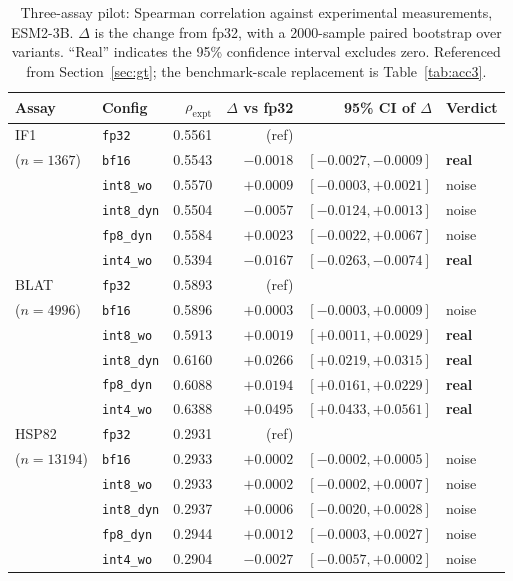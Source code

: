 \documentclass[11pt]{article}
\newcommand{\cfg}[1]{\texttt{#1}}
\begin{document}
\begin{table}[htb]
\centering
\caption{Three-assay pilot: Spearman correlation against experimental
measurements, ESM2-3B. $\Delta$ is the change from fp32, with a 2000-sample
paired bootstrap over variants. ``Real'' indicates the 95\% confidence interval
excludes zero. Referenced from Section~\ref{sec:gt}; the benchmark-scale
replacement is Table~\ref{tab:acc3}.}
\label{tab:pilotacc}
\small
\begin{tabular}{llrrrl}
\toprule
Assay & Config & $\rho_{\text{expt}}$ & $\Delta$ vs fp32 & 95\% CI of $\Delta$ & Verdict \\
\midrule
IF1        & \cfg{fp32}      & 0.5561 & (ref)    &                      &  \\
($n{=}1367$)& \cfg{bf16}      & 0.5543 & $-0.0018$ & $[-0.0027, -0.0009]$ & \textbf{real} \\
           & \cfg{int8\_wo}  & 0.5570 & $+0.0009$ & $[-0.0003, +0.0021]$ & noise \\
           & \cfg{int8\_dyn} & 0.5504 & $-0.0057$ & $[-0.0124, +0.0013]$ & noise \\
           & \cfg{fp8\_dyn}  & 0.5584 & $+0.0023$ & $[-0.0022, +0.0067]$ & noise \\
           & \cfg{int4\_wo}  & 0.5394 & $\mathbf{-0.0167}$ & $[-0.0263, -0.0074]$ & \textbf{real} \\
\midrule
BLAT       & \cfg{fp32}      & 0.5893 & (ref)    &                      &  \\
($n{=}4996$)& \cfg{bf16}      & 0.5896 & $+0.0003$ & $[-0.0003, +0.0009]$ & noise \\
           & \cfg{int8\_wo}  & 0.5913 & $+0.0019$ & $[+0.0011, +0.0029]$ & \textbf{real} \\
           & \cfg{int8\_dyn} & 0.6160 & $\mathbf{+0.0266}$ & $[+0.0219, +0.0315]$ & \textbf{real} \\
           & \cfg{fp8\_dyn}  & 0.6088 & $\mathbf{+0.0194}$ & $[+0.0161, +0.0229]$ & \textbf{real} \\
           & \cfg{int4\_wo}  & 0.6388 & $\mathbf{+0.0495}$ & $[+0.0433, +0.0561]$ & \textbf{real} \\
\midrule
HSP82      & \cfg{fp32}      & 0.2931 & (ref)    &                      &  \\
($n{=}13194$)& \cfg{bf16}    & 0.2933 & $+0.0002$ & $[-0.0002, +0.0005]$ & noise \\
           & \cfg{int8\_wo}  & 0.2933 & $+0.0002$ & $[-0.0002, +0.0007]$ & noise \\
           & \cfg{int8\_dyn} & 0.2937 & $+0.0006$ & $[-0.0020, +0.0028]$ & noise \\
           & \cfg{fp8\_dyn}  & 0.2944 & $+0.0012$ & $[-0.0003, +0.0027]$ & noise \\
           & \cfg{int4\_wo}  & 0.2904 & $-0.0027$ & $[-0.0057, +0.0002]$ & noise \\
\bottomrule
\end{tabular}
\end{table}
\end{document}
